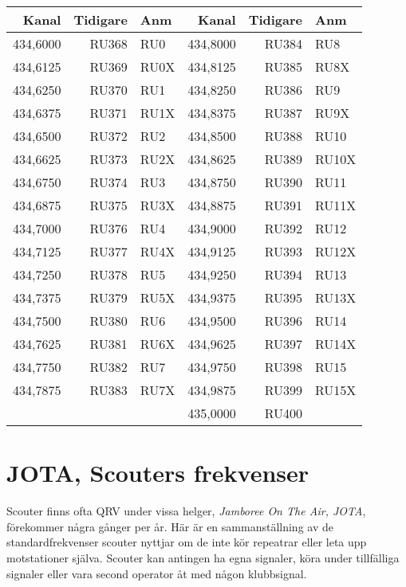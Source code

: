 \clearpage
\begin{longtable}{rrl|rrl}
\textbf{Kanal} & \textbf{Tidigare} & \textbf{Anm}   
&  \textbf{Kanal} & \textbf{Tidigare} & \textbf{Anm} \\ \hline
	434,6000 & RU368 & RU0  & 434,8000 & RU384 & RU8  \\
	434,6125 & RU369 & RU0X & 434,8125 & RU385 & RU8X \\
	434,6250 & RU370 & RU1  & 434,8250 & RU386 & RU9  \\
	434,6375 & RU371 & RU1X & 434,8375 & RU387 & RU9X \\
	434,6500 & RU372 & RU2  & 434,8500 & RU388 & RU10 \\
	434,6625 & RU373 & RU2X & 434,8625 & RU389 & RU10X\\
	434,6750 & RU374 & RU3  & 434,8750 & RU390 & RU11 \\
	434,6875 & RU375 & RU3X & 434,8875 & RU391 & RU11X\\
	434,7000 & RU376 & RU4  & 434,9000 & RU392 & RU12 \\
	434,7125 & RU377 & RU4X & 434,9125 & RU393 & RU12X\\
	434,7250 & RU378 & RU5  & 434,9250 & RU394 & RU13 \\
	434,7375 & RU379 & RU5X & 434,9375 & RU395 & RU13X\\
	434,7500 & RU380 & RU6  & 434,9500 & RU396 & RU14 \\
	434,7625 & RU381 & RU6X & 434,9625 & RU397 & RU14X\\
	434,7750 & RU382 & RU7  & 434,9750 & RU398 & RU15 \\
	434,7875 & RU383 & RU7X & 434,9875 & RU399 & RU15X\\
	         &       &      & 435,0000 & RU400 &     \\
\end{longtable}

\clearpage

\section{JOTA, Scouters frekvenser}

Scouter finns ofta QRV under vissa helger, \textit{Jamboree On The Air, JOTA}, förekommer några gånger per år. Här är en sammanställning av de standardfrekvenser scouter nyttjar om de inte kör repeatrar eller leta upp motstationer själva. Scouter kan antingen ha egna signaler, köra under
tillfälliga signaler eller vara second operator åt med någon klubbsignal.

